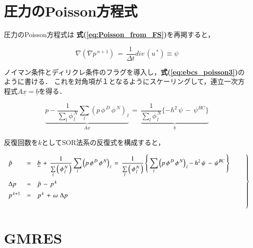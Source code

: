 \graphicspath{{./fig_EBCS/}}
%
\section{圧力のPoisson方程式}

圧力のPoisson方程式は \textbf{式(\ref{eq:Poisson_from_FS})}を再掲すると，

\begin{equation}
\nabla \left( \nabla p^{\,n+1} \right) \,=\, \frac{1}{\Delta t} div\, (u^{\,*}) \equiv \psi
\label{eq:Poisson_from_FS2}
\end{equation}

ノイマン条件とディリクレ条件のフラグを導入し，\textbf{式(\ref{eq:ebcs_poisson3})}のように書ける．
これを対角項が１となるようにスケーリングして，連立一次方程式$A\underline{x} = \underline{b}$を得る．

\begin{equation}
\underbrace{ p  -  \frac{1}{\sum \limits_l \phi^{\,N}_{\,l}} \sum \limits_l {\left( p \,\phi^{\,D} \,\phi^{\,N} \right)}_{\,l} } \limits_{A \underline{x} }
\,=\,
 \displaystyle { 
\underbrace{ 
\frac{1}{\sum \limits_l \phi^{\,N}_{\,l}} 
\{ 
- h^2 \,\psi \,-\,  \psi^{BC}
\}
} \limits_{ \underline{b} }
}
\label{eq:ebcs_poisson_4}
\end{equation}


反復回数を$k$としてSOR法系の反復式を構成すると，

\begin{equation}
\left.
\begin{array}{lll}
\vspace{2mm}
\tilde{p} & = & \displaystyle {  \underline{b} \, + \,
 \frac{1}{\sum \limits_l \left( \, \phi^{\,N}_{\,l} \, \right)} \sum \limits_l {\left( p \,\phi^{\,D} \,\phi^{\,N}\right)}_{\,l} 
 \,=\,
\frac{1}{\sum \limits_l \left( \, \phi^{\,N}_{\,l} \, \right)} 
\left \{ \,
\sum \limits_l {\left( p \,\phi^{\,D} \,\phi^{\,N}\right)}_{\,l} 
- h^2 \,\psi \,-\,  \psi^{BC}
\, \right \} } \\
\vspace{2mm}
\Delta p & = & \tilde{p} \,-\, p^{\,k} \\
\vspace{5mm}
p^{\,k+1} & = & p^{\,k} \,+\, \omega\, \,\Delta p \\

\end{array} \qquad \right \}
\label{eq:poisson_iteration}
\end{equation}


%
\section{GMRES}

